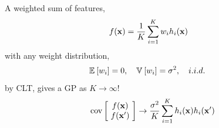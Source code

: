 \newsavebox\unistrain
\begin{lrbox}{\unistrain}
\hspace{0.1cm}
  \begin{minipage}{0.53\textwidth}
A weighted sum of features,
    \begin{align*}
f(\vx) & %
= \frac{1}{K} \sum_{i=1}^K \netweights_i \onefeat_i(\vx)
    \end{align*} 
with any weight distribution,
    \begin{align*}
\mathbb{E}_{} \left[ {w_i} \right] & = 0, \quad \mathbb{V}_{} \left[ {w_i} \right] = \sigma^2, \quad i.i.d.\ 
    \end{align*} 
by CLT, gives a GP as $K \to \infty$!
        \begin{align*}
\operatorname{cov} \left[ \! \begin{array}{c} f({\bf{x}}) \\ f({\bf{x}}') \end{array} \! \right] \to \frac{\sigma^2}{K}\sum_{i=1}^K h_i({\bf{x}})h_i({\bf{x}}')
    \end{align*} 
  \end{minipage}
\end{lrbox}


\def\layersep{2cm}
\def\nodesep{1.5cm}
\def\nodesize{1cm}

\newcommand{\numdims}[0]{2}
\newcommand{\numouts}[0]{1}
\newcommand{\numhidden}[0]{3}
\newcommand{\upnodedist}[0]{1cm}
\newcommand{\bardist}[0]{\hspace{-0.2cm}}





